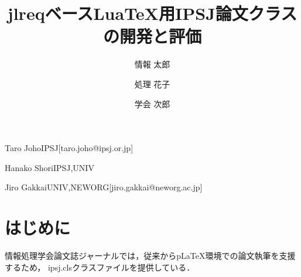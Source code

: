 \documentclass[submit]{ipsj-luatex}
\begin{document}
\title{{jlreqベースLuaTeX用IPSJ論文クラスの開発と評価}}




\author{情報 太郎}{Taro Joho}{IPSJ}[taro.joho@ipsj.or.jp]
\author{処理 花子}{Hanako Shori}{IPSJ,UNIV}
\author{学会 次郎}{Jiro Gakkai}{UNIV,NEWORG}[jiro.gakkai@neworg.ac.jp]
\maketitle


\section{はじめに}

情報処理学会論文誌ジャーナルでは，従来からpLaTeX環境での論文執筆を支援するため，
ipsj.clsクラスファイルを提供している．
\end{document}
